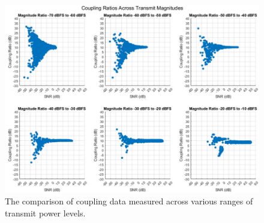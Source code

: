 \documentclass[journal]{IEEEtran}
\begin{document}
\begin{figure}[ht] %
    \centering
    \includegraphics[width=1\linewidth]{magDiffSweep.png}
    \vspace{-0.2in} %
    \caption{The comparison of coupling data measured across various ranges of transmit power levels.}
    \label{fig:magDiffSweep}
\end{figure}
\end{document}
